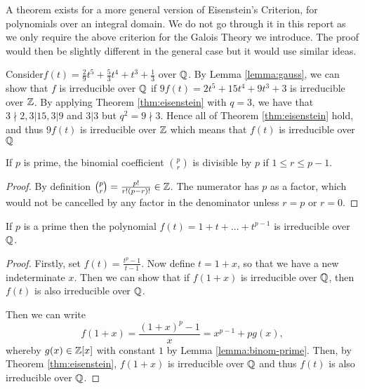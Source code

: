 A theorem exists for a more general version of Eisenstein's Criterion, for polynomials over an integral domain. We do not go through it in this report as we only require the above criterion for the Galois Theory we introduce. The proof would then be slightly different in the general case but it would use similar ideas.

\begin{example}
Consider$
f(t) = \frac{2}{9} t^5 + \frac{5}{3} t^4 + t^3 + \frac{1}{3}$ over $\mathbb Q$. By Lemma \ref{lemma:gauss}, we can show that $f$ is irreducible over $\mathbb Q$ if $
9f(t) = 2t^5 + 15t^4 + 9t^3 + 3
$ is irreducible over $\mathbb Z$. By applying Theorem \ref{thm:eisenstein} with $q = 3$, we have that $3 \nmid 2, 3|15, 3|9 $ and $3|3$ but $q^2 = 9 \nmid 3$. Hence all of Theorem \ref{thm:eisenstein} hold, and thus $9f(t)$ is irreducible over $\mathbb Z$ which means that $f(t)$ is irreducible over $\mathbb Q$

\end{example}

\begin{lemma} \label{lemma:binom-prime}
If $p$ is prime, the binomial coefficient $\binom{p}{r}$ is divisible by $p$ if $1 \le r \le p-1$.
\end{lemma}

\begin{proof}
By definition $\binom{p}{r} = \frac{p!}{r!(p-r)!} \in \mathbb Z$. The numerator has $p$ as a factor, which would not be cancelled by any factor in the denominator unless $r=p$ or $r=0$.
\end{proof}

\begin{theorem}\label{thm:irreducible-prime-polynomial}
    If $p$ is a prime then the polynomial
    $
    f(t) = 1 + t + ... + t^{p-1}
    $
    is irreducible over $\mathbb Q$.
\end{theorem}

\begin{proof}
Firstly, set $f(t) = \frac{t^p - 1}{t - 1}$. 
Now define $t =1+x$, so that we have a new indeterminate $x$. Then we can show that if $f(1+x)$ is irreducible over $\mathbb Q$, then $f(t)$ is also irreducible over $\mathbb Q$.

Then we can write $$f(1+x)=\frac{(1+x)^p - 1}{x}  = x^{p-1} + pg(x),$$ whereby $g(x)\in \mathbb Z[x]$ with constant $1$ by Lemma \ref{lemma:binom-prime}. Then, by Theorem \ref{thm:eisenstein}, $f(1+x)$ is irreducible over $\mathbb Q$ and thus $f(t)$ is also irreducible over $\mathbb Q$.
\end{proof}



